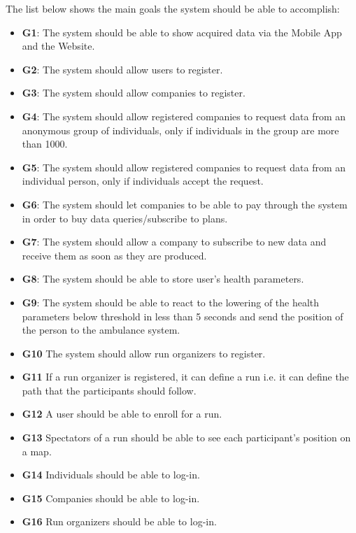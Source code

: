 The list below shows the main goals the system should be able to accomplish:

\begin{itemize}
    \item \textbf{G1}: The system should be able to show acquired data via the Mobile App and the Website.
    \item \textbf{G2}: The system should allow users to register.
    \item \textbf{G3}: The system should allow companies to register.
    \item \textbf{G4}: The system should allow registered companies to request data from an anonymous group of individuals, only if individuals in the group are more than 1000.
    \item \textbf{G5}: The system should allow registered companies to request data from an individual person, only if individuals accept the request.

    \item \textbf{G6}: The system should let companies to be able to pay through the system in order to buy data queries/subscribe to plans.

    \item \textbf{G7}: The system should allow a company to subscribe to new data and receive them as soon as they are produced.
    \item \textbf{G8}: The system should be able to store user's health parameters.
    \item \textbf{G9}: The system should be able to react to the lowering of the health parameters below threshold in less than 5 seconds and send the position of the person to the ambulance system. 
    
    \item \textbf{G10} The system should allow run organizers to register.
    \item \textbf{G11} If a run organizer is registered, it can define a run i.e. it can define the path that the participants should follow.
    \item \textbf{G12} A user should be able to enroll for a run.
    \item \textbf{G13} Spectators of a run should be able to see each participant's position on a map.
    \item \textbf{G14} Individuals should be able to log-in.
    \item \textbf{G15} Companies should be able to log-in.
    \item \textbf{G16} Run organizers should be able to log-in.

\end{itemize}





